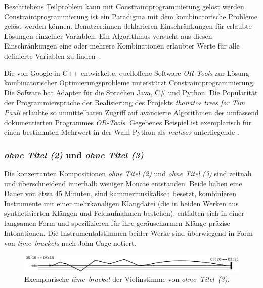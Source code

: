 \documentclass[12pt,a4paper,ngerman]{article}
\begin{document}
\bigskip

Beschriebens Teilproblem kann mit Constraintprogrammierung gelöst werden.
Constraintprogrammierung ist ein Paradigma mit dem kombinatorische Probleme gelöst werden können.
Benutzer:innen deklarieren Einschränkungen für erlaubte Lösungen einzelner Variablen.
Ein Algorithmus versucht aus diesen Einschränkungen eine oder mehrere Kombinationen erlaubter Werte für alle definierte Variablen zu finden~\parencite{constraintProgramming}.

\bigskip

Die von Google in C++ entwickelte, quelloffene Software \emph{OR-Tools} zur Lösung kombinatorischer Optimierungsprobleme unterstützt Constraintprogrammierung.
Die Sofware hat Adapter für die Sprachen Java, C\# und Python.
Die Popularität der Programmiersprache der Realisierung des Projekts \emph{thanatos trees for Tim Pauli} erlaubte so unmittelbaren Zugriff auf avancierte Algorithmen des umfassend dokumentierten Programmes \emph{OR-Tools}.
Gegebenes Beispiel ist exemplarisch für einen bestimmten Mehrwert in der Wahl Python als \emph{mutwos} unterliegende \emph{}.


%
%



\subsubsection{\emph{ohne Titel (2)} und \emph{ohne Titel (3)}}

Die konzertanten Kompositionen \emph{ohne Titel (2)} und \emph{ohne Titel (3)} sind zeitnah und überschneidend innerhalb weniger Monate entstanden.
Beide haben eine Dauer von etwa 45 Minuten, sind kammermusikalisch besetzt, kombinieren Instrumente mit einer mehrkanaligen Klangdatei (die in beiden Werken aus synthetisierten Klängen und Feldaufnahmen bestehen), entfalten sich in einer langsamen Form und spezifizieren für ihre geräuscharmen Klänge präzise Intonationen.
Die Instrumentalstimmen beider Werke sind überwiegend in Form von \emph{time--brackets} nach John Cage notiert.

\bigskip

\begin{figure}[h!]
    \begin{center}
        \includegraphics[scale=0.25]{pictures/time-bracket-ohne-titel-3-2.png}
    \end{center}
    \caption{%
        Exemplarische \emph{time--bracket} der Violinstimme von \emph{ohne~Titel~(3)}.
    }
\end{figure}
\end{document}
